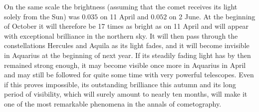 \par\indent On the same scale the brightness (assuming that the comet receives its light solely from the Sun) was $0.035$ on 11 April and $0.052$ on 2 June. At the beginning of October it will therefore be 17 times as bright as on 11 April and will appear with exceptional brilliance in the northern sky. It will then pass through the constellations Hercules and Aquila as its light fades, and it will become invisible in Aquarius at the beginning of next year. If its steadily fading light has by then remained strong enough, it may become visible once more in Aquarius in April and may still be followed for quite some time with very powerful telescopes. Even if this proves impossible, its outstanding brilliance this autumn and its long period of visibility, which will surely amount to nearly ten months, will make it one of the most remarkable phenomena in the annals of cometography.
